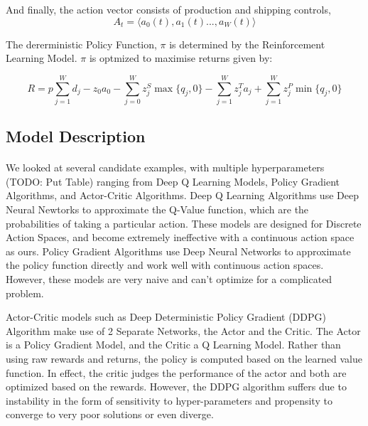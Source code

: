 \documentclass{article}
\begin{document}
And finally, the action vector consists of production and shipping controls,
\begin{equation}
    A_t = \langle a_0(t), a_1(t) ..., a_W(t) \rangle \label{eq:action_fmt}
\end{equation}

The dererministic Policy Function, \( \pi \) is determined by the Reinforcement Learning Model. \( \pi \) is optmized to maximise returns given by:

\begin{equation}
    R = p\sum_{j = 1}^Wd_j - z_0a_0 - \sum_{j = 0}^W z_j^S \max \{q_j, 0 \} - \sum_{j = 1}^W z_j^Ta_j + \sum_{j = 1}^Wz_j^P \min \{q_j, 0 \}
\end{equation}

\subsection{Model Description}

\paragraph{}

We looked at several candidate examples, with multiple hyperparameters (TODO: Put Table) ranging from Deep Q Learning Models, Policy Gradient Algorithms, and Actor-Critic Algorithms. Deep Q Learning Algorithms use Deep Neural Newtorks to approximate the Q-Value function, which are the probabilities of taking a particular action. These models are designed for Discrete Action Spaces, and become extremely ineffective with a continuous action space as ours. Policy Gradient Algorithms use Deep Neural Networks to approximate the policy function directly and work well with continuous action spaces. However, these models are very naive and can't optimize for a complicated problem. 

Actor-Critic models such as Deep Deterministic Policy Gradient (DDPG) Algorithm \cite{lillicrap_continuous_2019} make use of 2 Separate Networks, the Actor and the Critic. The Actor is a Policy Gradient Model, and the Critic a Q Learning Model. Rather than using raw rewards and returns, the policy is computed based on the learned value function. In effect, the critic judges the performance of the actor and both are optimized based on the rewards. However, the DDPG algorithm suffers due to instability in the form of sensitivity to hyper-parameters and propensity to converge to very poor solutions or even diverge. 
\end{document}
